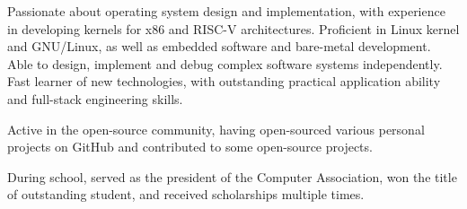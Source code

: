 \documentclass[en]{resume}
\begin{document}
\makeheader

\begin{paragraph}
Passionate about operating system design and implementation, with experience in developing kernels for x86 and RISC-V architectures. Proficient in Linux kernel and GNU/Linux, as well as embedded software and bare-metal development. 
Able to design, implement and debug complex software systems independently. Fast learner of new technologies, with outstanding practical application ability and full-stack engineering skills. 
\end{paragraph}

\begin{paragraph}
Active in the open-source community, having open-sourced various personal projects on GitHub and contributed to some open-source projects. 
\end{paragraph}

\begin{paragraph}
During school, served as the president of the Computer Association, won the title of outstanding student, and received scholarships multiple times.
\end{paragraph}

\begin{competences}[11em]
\end{competences}
\end{document}
